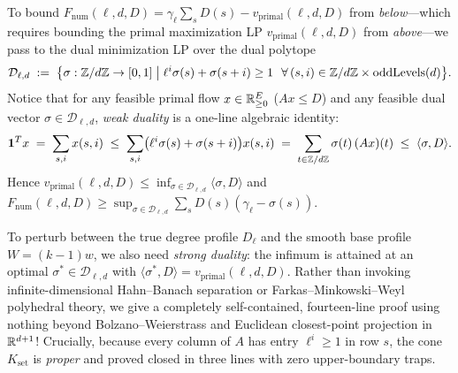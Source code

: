 To bound $F_{\mathrm{num}}(\ell, d, D) = \gamma_\ell \sum_s D(s) - v_{\mathrm{primal}}(\ell, d, D)$ from \emph{below}—which requires bounding the primal maximization LP $v_{\mathrm{primal}}(\ell, d, D)$ from \emph{above}—we pass to the dual minimization LP over the dual polytope
\begin{equation}
\label{eq:08:dual-polytope}
  \mathcal{D}_{\ell, d} \;:=\; \bigl\{\sigma : \mathbb{Z}/d\mathbb{Z} \to [0, 1] \;\big|\; \ell^i \sigma(s) + \sigma(s + i) \ge 1\ \ \forall\, (s, i) \in \mathbb{Z}/d\mathbb{Z} \times \mathrm{oddLevels}(d)\bigr\}.
\end{equation}
Notice that for any feasible primal flow $x \in \mathbb{R}_{\ge 0}^E$ ($A x \le D$) and any feasible dual vector $\sigma \in \mathcal{D}_{\ell, d}$, \emph{weak duality} is a one-line algebraic identity:
\begin{equation}
\label{eq:08:weak-duality}
  \mathbf{1}^T x \;=\; \sum_{s, i} x(s, i) \;\le\; \sum_{s, i} \bigl(\ell^i \sigma(s) + \sigma(s + i)\bigr) x(s, i)
  \;=\; \sum_{t \in \mathbb{Z}/d\mathbb{Z}} \sigma(t)\,(A x)(t) \;\le\; \langle \sigma, D \rangle.
\end{equation}
Hence $v_{\mathrm{primal}}(\ell, d, D) \le \inf_{\sigma \in \mathcal{D}_{\ell, d}} \langle \sigma, D \rangle$ and $F_{\mathrm{num}}(\ell, d, D) \ge \sup_{\sigma \in \mathcal{D}_{\ell, d}} \sum_s D(s)(\gamma_\ell - \sigma(s))$.

To perturb between the true degree profile $D_\ell$ and the smooth base profile $W = (k - 1)w$, we also need \emph{strong duality}: the infimum is attained at an optimal $\sigma^* \in \mathcal{D}_{\ell, d}$ with $\langle \sigma^*, D \rangle = v_{\mathrm{primal}}(\ell, d, D)$. Rather than invoking infinite-dimensional Hahn--Banach separation or Farkas--Minkowski--Weyl polyhedral theory, we give a completely self-contained, fourteen-line proof using nothing beyond Bolzano--Weierstrass and Euclidean closest-point projection in $\mathbb{R}^{d+1}$! Crucially, because every column of $A$ has entry $\ell^i \ge 1$ in row $s$, the cone $K_{\mathrm{set}}$ is \emph{proper} and proved closed in three lines with zero upper-boundary traps.


